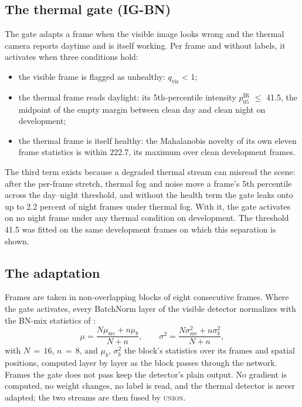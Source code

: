 \documentclass[journal]{IEEEtran}
\begin{document}
\subsection{The thermal gate (\mbox{IG-BN})}\label{sec:4.2}
The gate adapts a frame when the visible image looks wrong and the thermal camera reports daytime and is itself working. Per frame and without labels, it activates when three conditions hold:
\begin{itemize}
\item the visible frame is flagged as unhealthy: $q_{\mathrm{vis}}$ < 1;
\item the thermal frame reads daylight: its 5th-percentile intensity $p_{05}^{\mathrm{IR}}$ $\leq$ 41.5, the midpoint of the empty margin between clean day and clean night on development;
\item the thermal frame is itself healthy: the Mahalanobis novelty of its own eleven frame statistics is within 222.7, its maximum over clean development frames.
\end{itemize}

The third term exists because a degraded thermal stream can misread the scene: after the per-frame stretch, thermal fog and noise move a frame's 5th percentile across the day--night threshold, and without the health term the gate leaks onto up to 2.2 percent of night frames under thermal fog. With it, the gate activates on no night frame under any thermal condition on development. The threshold 41.5 was fitted on the same development frames on which this separation is shown.

\subsection{The adaptation}\label{sec:4.3}
Frames are taken in non-overlapping blocks of eight consecutive frames. Where the gate activates, every BatchNorm layer of the visible detector normalizes with the BN-mix statistics of \citet{schneider2020improving}:
\begin{equation*}\mu = \frac{N\mu_{\mathrm{src}} + n\mu_b}{N+n},\qquad \sigma^2 = \frac{N\sigma^2_{\mathrm{src}} + n\sigma^2_b}{N+n},\end{equation*}
with $N\,{=}\,16$, $n\,{=}\,8$, and $\mu_b$, $\sigma^2_b$ the block's statistics over its frames and spatial positions, computed layer by layer as the block passes through the network. Frames the gate does not pass keep the detector's plain output. No gradient is computed, no weight changes, no label is read, and the thermal detector is never adapted; the two streams are then fused by \textsc{union}.
\end{document}
